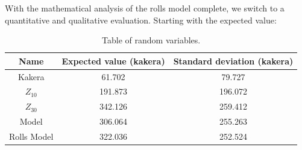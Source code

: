 \documentclass[11pt, oneside]{article}
\theoremstyle{plain}
\theoremstyle{definition}
\begin{document}
With the mathematical analysis of the rolls model complete, we switch to a
quantitative and qualitative evaluation. Starting with the expected value: 
\begin{table}[h!]
  \centering
  \begin{tabular}{|c|c|c|} 
    \hline
    Name & Expected value (kakera) & Standard deviation (kakera) \\
    \hline \hline
          Kakera &  61.702 &  79.727 \\ \hline
    \( Z_{10} \) & 191.873 & 196.072 \\ \hline
    \( Z_{30} \) & 342.126 & 259.412 \\ \hline
           Model & 306.064 & 255.263 \\ \hline
     Rolls Model & 322.036 & 252.524 \\ \hline
  \end{tabular}
  \caption{Table of random variables.}
\end{table}
\end{document}
